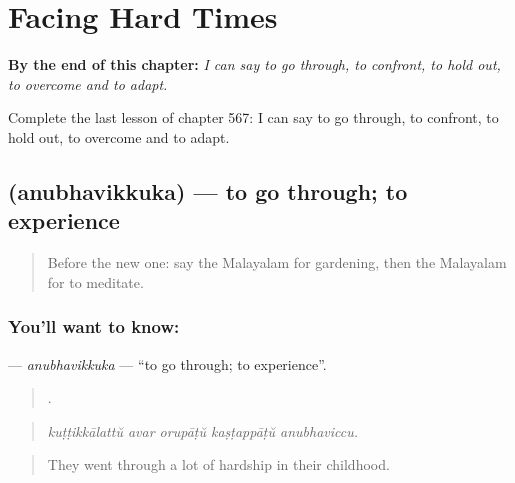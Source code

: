 
\chapter{Facing Hard Times}
\label{ch:ml-facing-hard-times}

\begin{chapteropening}
\textbf{By the end of this chapter:} \emph{I can say to go through, to confront, to hold out, to overcome and to adapt.}

Complete the last lesson of chapter 567: I can say to go through, to confront, to hold out, to overcome and to adapt.
\end{chapteropening}

\section[\texorpdfstring{\ml{അനുഭവിക്കുക} (anubhavikkuka)}{അനുഭവിക്കുക (anubhavikkuka)}]{ (anubhavikkuka) — to go through; to experience}

\label{lesson:ML-C567-anubhavikkuka}



\begin{quote}
Before the new one: say the Malayalam for gardening, then the Malayalam for to meditate.
\end{quote}

\subsection*{You'll want to know: }
\textbf{} — \emph{anubhavikkuka} — \textquotedblleft{}to go through; to experience\textquotedblright{}.

\begin{quote}
    .
\end{quote}

\begin{quote}
\emph{kuṭṭikkālattŭ avar orupāṭŭ kaṣṭappāṭŭ anubhaviccu.}
\end{quote}

\begin{quote}
They went through a lot of hardship in their childhood.
\end{quote}

